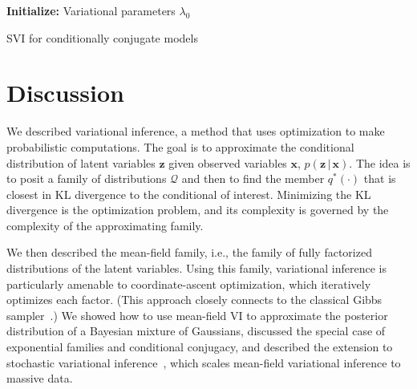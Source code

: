 \documentclass{article}
\begin{document}
\begin{algorithm}[t]
\textbf{Initialize:} Variational parameters $\lambda_0$\\
\Return{$\lambda$}
\caption{\gls{SVI} for conditionally conjugate models}
\label{alg:svi}
\end{algorithm}
 \glsresetall{}
\section{Discussion}
\label{sec:discussion}

We described variational inference, a method that uses optimization to
make probabilistic computations.  The goal is to approximate the
conditional distribution of latent variables ${\mathbf{z}}$ given observed
variables ${\mathbf{x}}$, $p({\mathbf{z}} {\,\vert\,} {\mathbf{x}})$.  The idea is to posit a family of
distributions ${\mathcal{Q}}$ and then to find the member $q^*(\cdot)$ that is
closest in \gls{KL} divergence to the conditional of interest.
Minimizing the \gls{KL} divergence is the optimization problem, and
its complexity is governed by the complexity of the approximating
family.

We then described the mean-field family, i.e., the family of fully
factorized distributions of the latent variables.  Using this family,
variational inference is particularly amenable to coordinate-ascent
optimization, which iteratively optimizes each factor. (This approach
closely connects to the classical Gibbs
sampler~\citep{Geman:1984,Gelfand:1990}.)  We showed how to use
mean-field \gls{VI} to approximate the posterior distribution of a
Bayesian mixture of Gaussians, discussed the special case of
exponential families and conditional conjugacy, and described the
extension to stochastic variational inference~\citep{Hoffman:2013},
which scales mean-field variational inference to massive data.
\end{document}
